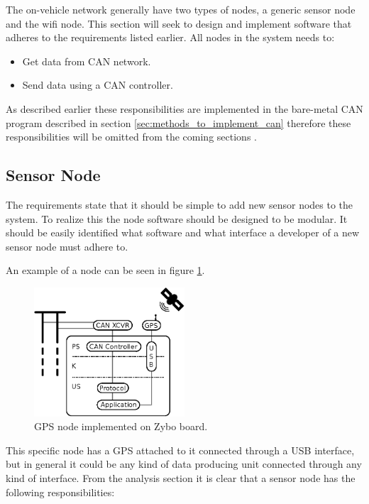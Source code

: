 The on-vehicle network generally have two types of nodes, a generic sensor node and the wifi node.
This section will seek to design and implement software that adheres to the requirements listed earlier.
All nodes in the system needs to:
\begin{itemize}
\item Get data from CAN network.
\item Send data using a CAN controller.
\end{itemize}
As described earlier these responsibilities are implemented in the bare-metal CAN program described in section \ref{sec:methods_to_implement_can} therefore these responsibilities will be omitted from the coming sections .

\subsection{Sensor Node}
\label{sec:sensor_node}
The requirements state that it should be simple to add new sensor nodes to the system. 
To realize this the node software should be designed to be modular.
It should be easily identified what software and what interface a developer of a new sensor node must adhere to.

An example of a node can be seen in figure \ref{fig:gps_node}.


\begin{figure}[!h]
\centering
\includegraphics[width=0.5\textwidth]{graphics/analysis_gps.eps}
\caption{GPS node implemented on Zybo board.}
\label{fig:gps_node}
\end{figure}

This specific node has a GPS attached to it connected through a USB interface, but in general it could be any kind of data producing unit connected through any kind of interface.
From the analysis section it is clear that a sensor node has the following responsibilities:

